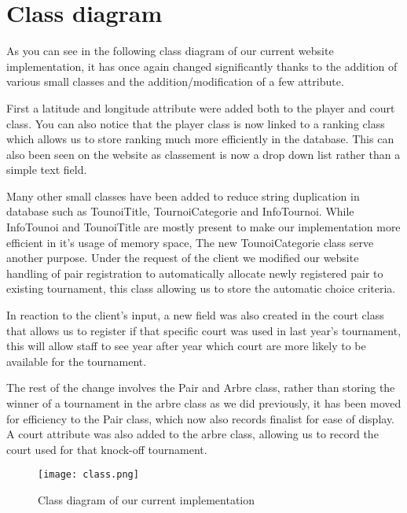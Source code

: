 \section{Class diagram}

As you can see in the following class diagram of our current website implementation, it has once again changed significantly thanks to the addition of various small classes and the addition/modification of a few attribute. \newline

First a latitude and longitude attribute were added both to the player and court class. You can also notice that the player class is now linked to a ranking class which allows us to store ranking much more efficiently in the database. This can also been seen on the website as classement is now a drop down list rather than a simple text field.\newline

Many other small classes have been added to reduce string duplication in database such as TounoiTitle, TournoiCategorie and InfoTournoi. While InfoTounoi and TounoiTitle are mostly present to make our implementation more efficient in it's usage of memory space, The new TounoiCategorie class serve another purpose. Under the request of the client we modified our website handling of pair registration to automatically allocate newly registered pair to existing tournament, this class allowing us to store the automatic choice criteria.\newline

In reaction to the client's input, a new field was also created in the court class that allows us to register if that specific court was used in last year's tournament, this will allow staff to see year after year which court are more likely to be available for the tournament. \newline

The rest of the change involves the Pair and Arbre class, rather than storing the winner of a tournament in the arbre class as we did previously, it has been moved for efficiency to the Pair class, which now also records finalist for ease of display. A court attribute was also added to the arbre class, allowing us to record the court used for that knock-off tournament.

\begin{figure}[!ht]
	\centering
	\texttt{[image: class.png]}
	\caption{Class diagram of our current implementation}
	\label{fig:length_eight_mouse}
\end{figure}
\FloatBarrier